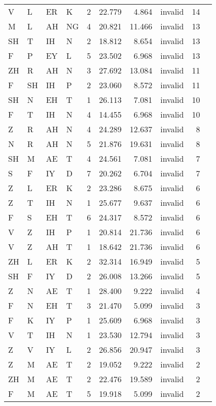 \begin{longtable}{l@{ } l@{ } l@{ } l r r r r r r}
V  & L  & ER & K  & 2  & 22.779 & 4.864  & invalid & 14 \\
M  & L  & AH & NG & 4  & 20.821 & 11.466 & invalid & 13 \\
SH & T  & IH & N  & 2  & 18.812 & 8.654  & invalid & 13 \\
F  & P  & EY & L  & 5  & 23.502 & 6.968  & invalid & 13 \\
ZH & R  & AH & N  & 3  & 27.692 & 13.084 & invalid & 11 \\
F  & SH & IH & P  & 2  & 23.060 & 8.572  & invalid & 11 \\
SH & N  & EH & T  & 1  & 26.113 & 7.081  & invalid & 10 \\
F  & T  & IH & N  & 4  & 14.455 & 6.968  & invalid & 10 \\
Z  & R  & AH & N  & 4  & 24.289 & 12.637 & invalid & 8 \\
N  & R  & AH & N  & 5  & 21.876 & 19.631 & invalid & 8 \\
SH & M  & AE & T  & 4  & 24.561 & 7.081  & invalid & 7 \\
S  & F  & IY & D  & 7  & 20.262 & 6.704  & invalid & 7 \\
Z  & L  & ER & K  & 2  & 23.286 & 8.675  & invalid & 6 \\
Z  & T  & IH & N  & 1  & 25.677 & 9.637  & invalid & 6 \\
F  & S  & EH & T  & 6  & 24.317 & 8.572  & invalid & 6 \\
V  & Z  & IH & P  & 1  & 20.814 & 21.736 & invalid & 6 \\
V  & Z  & AH & T  & 1  & 18.642 & 21.736 & invalid & 6 \\
ZH & L  & ER & K  & 2  & 32.314 & 16.949 & invalid & 5 \\
SH & F  & IY & D  & 2  & 26.008 & 13.266 & invalid & 5 \\
Z  & N  & AE & T  & 1  & 28.400 & 9.222  & invalid & 4 \\
F  & N  & EH & T  & 3  & 21.470 & 5.099  & invalid & 3 \\
F  & K  & IY & P  & 1  & 25.609 & 6.968  & invalid & 3 \\
V  & T  & IH & N  & 1  & 23.530 & 12.794 & invalid & 3 \\
Z  & V  & IY & L  & 2  & 26.856 & 20.947 & invalid & 3 \\
Z  & M  & AE & T  & 2  & 19.052 & 9.222  & invalid & 2 \\
ZH & M  & AE & T  & 2  & 22.476 & 19.589 & invalid & 2 \\
F  & M  & AE & T  & 5  & 19.918 & 5.099  & invalid & 2 \\

\end{longtable}
